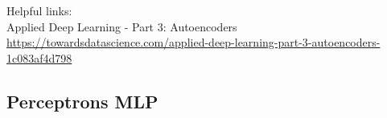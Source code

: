 Helpful links:\\
Applied Deep Learning - Part 3: Autoencoders
\\
\url{https://towardsdatascience.com/applied-deep-learning-part-3-autoencoders-1c083af4d798}

\subsection{Perceptrons MLP}




\newpage